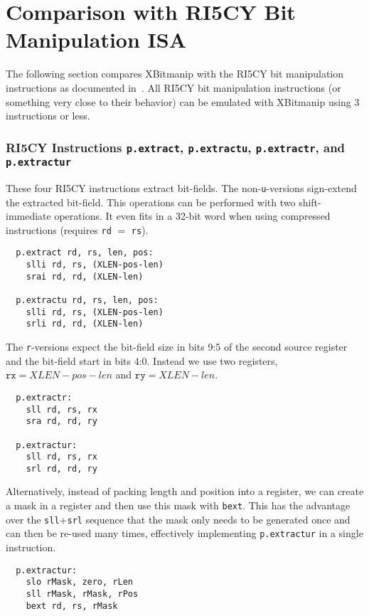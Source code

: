 \section{Comparison with RI5CY Bit Manipulation ISA}

The following section compares XBitmanip with the RI5CY bit manipulation
instructions as documented in~\cite{Ri5cy}. All RI5CY bit manipulation
instructions (or something very close to their behavior) can be emulated with
XBitmanip using 3 instructions or less.

\subsubsection{RI5CY Instructions {\tt p.extract}, {\tt p.extractu}, {\tt p.extractr}, and {\tt p.extractur}}

These four RI5CY instructions extract bit-fields. The non-{\tt u}-versions sign-extend
the extracted bit-field. This operations can be performed with two shift-immediate
operations. It even fits in a 32-bit word when using compressed instructions (requires
{\tt rd} $=$ {\tt rs}).

\begin{verbatim}
  p.extract rd, rs, len, pos:
    slli rd, rs, (XLEN-pos-len)
    srai rd, rd, (XLEN-len)

  p.extractu rd, rs, len, pos:
    slli rd, rs, (XLEN-pos-len)
    srli rd, rd, (XLEN-len)
\end{verbatim}

The {\tt r}-versions expect the bit-field size in bits 9:5 of the second source
register and the bit-field start in bits 4:0. Instead we use two registers,
$\texttt{rx} = XLEN-pos-len$ and $\texttt{ry} = XLEN-len$.

\begin{verbatim}
  p.extractr:
    sll rd, rs, rx
    sra rd, rd, ry

  p.extractur:
    sll rd, rs, rx
    srl rd, rd, ry
\end{verbatim}

Alternatively, instead of packing length and position into a register, we
can create a mask in a register and then use this mask with {\tt bext}. This
has the advantage over the {\tt sll}+{\tt srl} sequence that the mask only needs
to be generated once and can then be re-used many times, effectively implementing
{\tt p.extractur} in a single instruction.

\begin{verbatim}
  p.extractur:
    slo rMask, zero, rLen
    sll rMask, rMask, rPos
    bext rd, rs, rMask
\end{verbatim}

